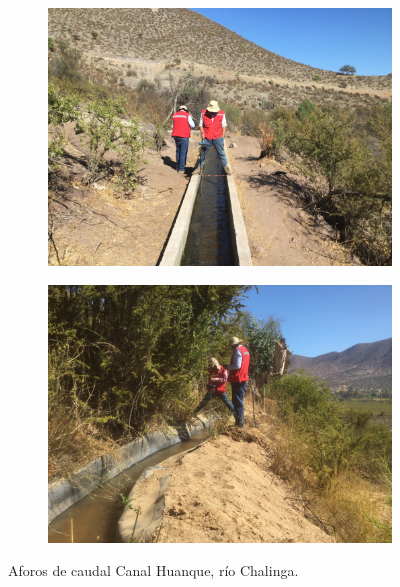 \documentclass[]{article}
\begin{document}
\begin{figure}[H]
  \centering
\begin{subfigure}{.45\textwidth}
\hfill
  \includegraphics[angle= 180, width=\textwidth]{Foto/h3.jpg}
\end{subfigure}
\hfill
\begin{subfigure}{.45\textwidth}
\hfill
  \includegraphics[width=\textwidth]{Foto/h4.jpg} 
\end{subfigure}
\caption{Aforos de caudal Canal Huanque, río Chalinga.}
\end{figure}
\end{document}
